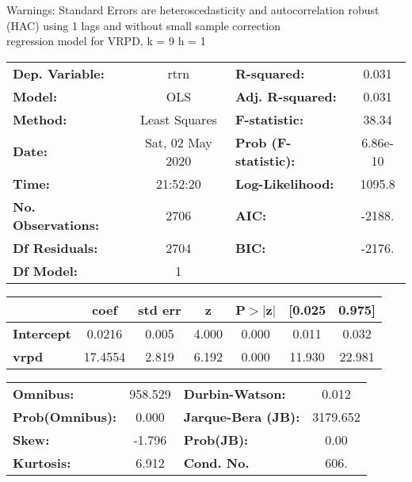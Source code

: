 Warnings: \newline
 [1] Standard Errors are heteroscedasticity and autocorrelation robust (HAC) using 1 lags and without small sample correction\\ 

regression model for VRPD, k = 9 h = 1\begin{center}
\begin{tabular}{lclc}
\toprule
\textbf{Dep. Variable:}    &       rtrn       & \textbf{  R-squared:         } &     0.031   \\
\textbf{Model:}            &       OLS        & \textbf{  Adj. R-squared:    } &     0.031   \\
\textbf{Method:}           &  Least Squares   & \textbf{  F-statistic:       } &     38.34   \\
\textbf{Date:}             & Sat, 02 May 2020 & \textbf{  Prob (F-statistic):} &  6.86e-10   \\
\textbf{Time:}             &     21:52:20     & \textbf{  Log-Likelihood:    } &    1095.8   \\
\textbf{No. Observations:} &        2706      & \textbf{  AIC:               } &    -2188.   \\
\textbf{Df Residuals:}     &        2704      & \textbf{  BIC:               } &    -2176.   \\
\textbf{Df Model:}         &           1      & \textbf{                     } &             \\
\bottomrule
\end{tabular}
\begin{tabular}{lcccccc}
                   & \textbf{coef} & \textbf{std err} & \textbf{z} & \textbf{P$> |$z$|$} & \textbf{[0.025} & \textbf{0.975]}  \\
\midrule
\textbf{Intercept} &       0.0216  &        0.005     &     4.000  &         0.000        &        0.011    &        0.032     \\
\textbf{vrpd}      &      17.4554  &        2.819     &     6.192  &         0.000        &       11.930    &       22.981     \\
\bottomrule
\end{tabular}
\begin{tabular}{lclc}
\textbf{Omnibus:}       & 958.529 & \textbf{  Durbin-Watson:     } &    0.012  \\
\textbf{Prob(Omnibus):} &   0.000 & \textbf{  Jarque-Bera (JB):  } & 3179.652  \\
\textbf{Skew:}          &  -1.796 & \textbf{  Prob(JB):          } &     0.00  \\
\textbf{Kurtosis:}      &   6.912 & \textbf{  Cond. No.          } &     606.  \\
\bottomrule
\end{tabular}
\end{center}

